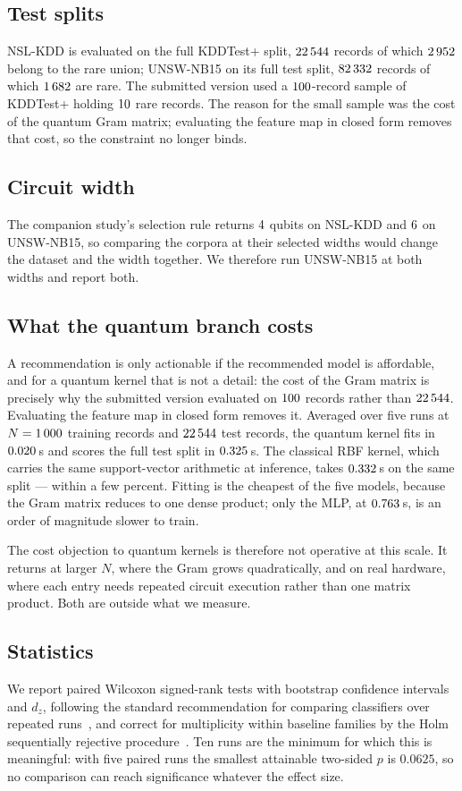 \documentclass[journal]{IEEEtran}
\begin{document}
\subsection{Test splits}
NSL-KDD is evaluated on the full KDDTest+ split, $22\,544$ records of which
$2\,952$ belong to the rare union; UNSW-NB15 on its full test split,
$82\,332$ records of which $1\,682$ are rare. The submitted version
used a $100$-record sample of KDDTest+ holding $10$ rare
records. The reason for the small sample was the cost of the quantum Gram
matrix; evaluating the feature map in closed form removes that cost, so the
constraint no longer binds.

\subsection{Circuit width}
The companion study's selection rule returns $4$ qubits on
NSL-KDD and $6$ on UNSW-NB15, so comparing the corpora at their
selected widths would change the dataset and the width together. We
therefore run UNSW-NB15 at both widths and report both.

\subsection{What the quantum branch costs}
A recommendation is only actionable if the recommended model is affordable,
and for a quantum kernel that is not a detail: the cost of the Gram matrix
is precisely why the submitted version evaluated on
$100$ records rather than $22\,544$. Evaluating the feature map in
closed form removes it. Averaged over five runs at $N=1\,000$ training
records and $22\,544$ test records, the quantum kernel fits in
$0.020$\,s and scores the full test split in $0.325$\,s.
The classical RBF kernel, which carries the same support-vector arithmetic
at inference, takes $0.332$\,s on the same split --- within a few
percent. Fitting is the cheapest of the five models, because the Gram
matrix reduces to one dense product; only the MLP, at $0.763$\,s, is
an order of magnitude slower to train.

The cost objection to quantum kernels is therefore not operative at this
scale. It returns at larger $N$, where the Gram grows quadratically, and on
real hardware, where each entry needs repeated circuit execution rather
than one matrix product. Both are outside what we measure.

\subsection{Statistics}
We report paired Wilcoxon signed-rank tests with bootstrap confidence
intervals and $d_z$, following the standard recommendation for comparing
classifiers over repeated runs~\cite{demsar2006statistical}, and correct
for multiplicity within baseline families by the Holm sequentially
rejective procedure~\cite{holm1979simple}. Ten runs are the minimum for
which this is meaningful: with five paired runs the smallest attainable
two-sided $p$ is $0.0625$, so no comparison can reach significance
whatever the effect size.
\end{document}
